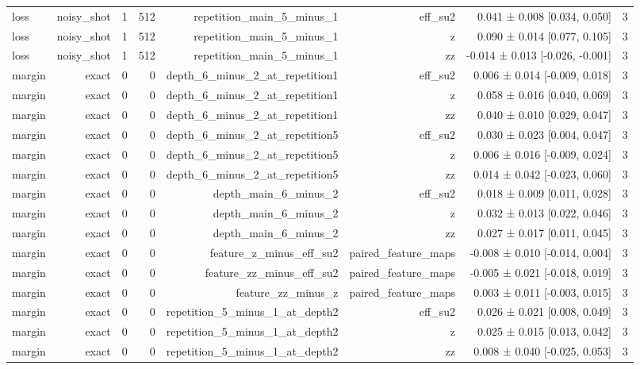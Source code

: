 \begin{table}
\begin{tabular}{lrrrrrrr}
loss & noisy\_shot & 1 & 512 & repetition\_main\_5\_minus\_1 & eff\_su2 & 0.041 ± 0.008 [0.034, 0.050] & 3 \\
loss & noisy\_shot & 1 & 512 & repetition\_main\_5\_minus\_1 & z & 0.090 ± 0.014 [0.077, 0.105] & 3 \\
loss & noisy\_shot & 1 & 512 & repetition\_main\_5\_minus\_1 & zz & -0.014 ± 0.013 [-0.026, -0.001] & 3 \\
margin & exact & 0 & 0 & depth\_6\_minus\_2\_at\_repetition1 & eff\_su2 & 0.006 ± 0.014 [-0.009, 0.018] & 3 \\
margin & exact & 0 & 0 & depth\_6\_minus\_2\_at\_repetition1 & z & 0.058 ± 0.016 [0.040, 0.069] & 3 \\
margin & exact & 0 & 0 & depth\_6\_minus\_2\_at\_repetition1 & zz & 0.040 ± 0.010 [0.029, 0.047] & 3 \\
margin & exact & 0 & 0 & depth\_6\_minus\_2\_at\_repetition5 & eff\_su2 & 0.030 ± 0.023 [0.004, 0.047] & 3 \\
margin & exact & 0 & 0 & depth\_6\_minus\_2\_at\_repetition5 & z & 0.006 ± 0.016 [-0.009, 0.024] & 3 \\
margin & exact & 0 & 0 & depth\_6\_minus\_2\_at\_repetition5 & zz & 0.014 ± 0.042 [-0.023, 0.060] & 3 \\
margin & exact & 0 & 0 & depth\_main\_6\_minus\_2 & eff\_su2 & 0.018 ± 0.009 [0.011, 0.028] & 3 \\
margin & exact & 0 & 0 & depth\_main\_6\_minus\_2 & z & 0.032 ± 0.013 [0.022, 0.046] & 3 \\
margin & exact & 0 & 0 & depth\_main\_6\_minus\_2 & zz & 0.027 ± 0.017 [0.011, 0.045] & 3 \\
margin & exact & 0 & 0 & feature\_z\_minus\_eff\_su2 & paired\_feature\_maps & -0.008 ± 0.010 [-0.014, 0.004] & 3 \\
margin & exact & 0 & 0 & feature\_zz\_minus\_eff\_su2 & paired\_feature\_maps & -0.005 ± 0.021 [-0.018, 0.019] & 3 \\
margin & exact & 0 & 0 & feature\_zz\_minus\_z & paired\_feature\_maps & 0.003 ± 0.011 [-0.003, 0.015] & 3 \\
margin & exact & 0 & 0 & repetition\_5\_minus\_1\_at\_depth2 & eff\_su2 & 0.026 ± 0.021 [0.008, 0.049] & 3 \\
margin & exact & 0 & 0 & repetition\_5\_minus\_1\_at\_depth2 & z & 0.025 ± 0.015 [0.013, 0.042] & 3 \\
margin & exact & 0 & 0 & repetition\_5\_minus\_1\_at\_depth2 & zz & 0.008 ± 0.040 [-0.025, 0.053] & 3 \\

\end{tabular}
\end{table}
